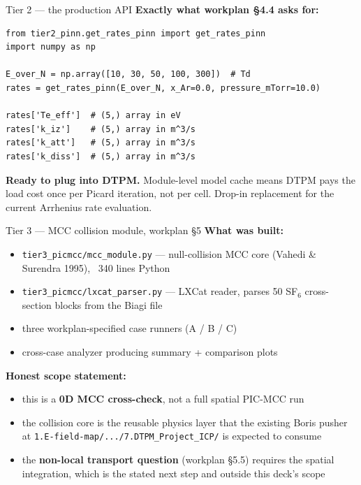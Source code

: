 \documentclass[10pt,aspectratio=169]{beamer}
\begin{document}
\begin{frame}[fragile]{Tier 2 --- the production API}
  \small
  \textbf{Exactly what workplan \S4.4 asks for:}
\begin{verbatim}
from tier2_pinn.get_rates_pinn import get_rates_pinn
import numpy as np

E_over_N = np.array([10, 30, 50, 100, 300])  # Td
rates = get_rates_pinn(E_over_N, x_Ar=0.0, pressure_mTorr=10.0)

rates['Te_eff']  # (5,) array in eV
rates['k_iz']    # (5,) array in m^3/s
rates['k_att']   # (5,) array in m^3/s
rates['k_diss']  # (5,) array in m^3/s
\end{verbatim}

  \vspace{0.2em}
  \textbf{Ready to plug into DTPM.} Module-level model cache means
  DTPM pays the load cost once per Picard iteration, not per cell.
  Drop-in replacement for the current Arrhenius rate evaluation.
\end{frame}

\begin{frame}{Tier 3 --- MCC collision module, workplan \S5}
  \small
  \textbf{What was built:}
  \begin{itemize}\small
    \item \texttt{tier3\_picmcc/mcc\_module.py} --- null-collision MCC
          core (Vahedi \& Surendra 1995), ~340 lines Python
    \item \texttt{tier3\_picmcc/lxcat\_parser.py} --- LXCat reader,
          parses 50 SF$_6$ cross-section blocks from the Biagi file
    \item three workplan-specified case runners (A / B / C)
    \item cross-case analyzer producing summary + comparison plots
  \end{itemize}

  \vspace{0.3em}
  \textbf{Honest scope statement:}
  \begin{itemize}\small
    \item this is a \textbf{0D MCC cross-check}, not a full spatial
          PIC-MCC run
    \item the collision core is the reusable physics layer that the
          existing Boris pusher at
          \texttt{1.E-field-map/.../7.DTPM\_Project\_ICP/} is
          expected to consume
    \item the \textbf{non-local transport question} (workplan \S5.5)
          requires the spatial integration, which is the stated
          next step and outside this deck's scope
  \end{itemize}
\end{frame}
\end{document}
